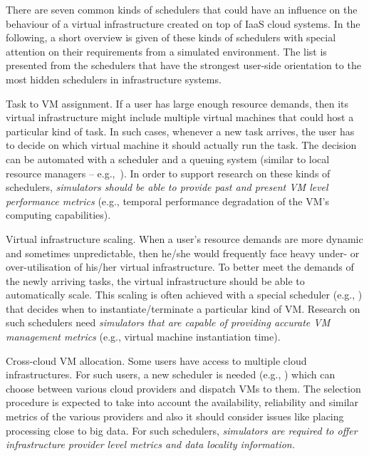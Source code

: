 \documentclass[sort, compress, 5p]{elsarticle}
\begin{document}
There are seven common kinds of schedulers that could have an influence on the behaviour of a virtual infrastructure created on top of IaaS cloud systems. In the following, a short overview is given of these kinds of schedulers with special attention on their requirements from a simulated environment. The list is presented from the schedulers that have the strongest user-side orientation to the most hidden schedulers in infrastructure systems. 
\begin{description*}
\item[Task to VM assignment.] If a user has large enough resource demands, then its virtual infrastructure might include multiple virtual machines that could host a particular kind of task. In such cases, whenever a new task arrives, the user has to decide on which virtual machine it should actually run the task. The decision can be automated with a scheduler and a queuing  system (similar to local resource managers -- e.g.,~\cite{Sobie:2013:HSC:2465848.2465850, 6332105}). In order to support research on these kinds of schedulers, \emph{simulators should be able to provide past and present VM level performance metrics} (e.g., temporal performance degradation of the VM's computing capabilities).
\item[Virtual infrastructure scaling.] When a user's resource demands are more dynamic and sometimes unpredictable, then he/she would frequently face heavy under- or over-utilisation of his/her virtual infrastructure. To better meet the demands of the newly arriving tasks, the virtual infrastructure should be able to automatically scale. This scaling is often achieved with a special scheduler (e.g., \cite{rodrigez2009,Sotomayor:2008:CBE:1383422.1383434}) that decides when to instantiate/terminate a particular kind of VM. Research on such schedulers need \emph{simulators that are capable of providing accurate VM management metrics} (e.g., virtual machine instantiation time).
\item[Cross-cloud VM allocation.] Some users have access to multiple cloud infrastructures. For such users, a new scheduler is needed (e.g., \cite{Tordsson2012358, 5279590}) which can choose between various cloud providers and dispatch VMs to them. The selection procedure is expected to take into account the availability, reliability and similar metrics of the various providers and also it should consider issues like placing processing close to big data. For such schedulers, \emph{simulators are required to offer infrastructure provider level metrics and data locality information.}

\end{description*}
\end{document}
